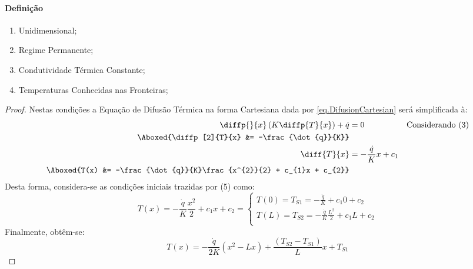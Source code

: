 \documentclass{article}
\begin{document}
            \paragraph{Definição}
                \begin{enumerate}[noitemsep]
                    \item Unidimensional;
                    \item Regime Permanente;
                    \item Condutividade Térmica Constante;
                    \item Temperaturas Conhecidas nas Fronteiras;
                \end{enumerate}
                \begin{proof}
                    Nestas condições a Equação de Difusão Térmica na forma Cartesiana dada por \ref{eq.DifusionCartesian} será simplificada à:
                        \begin{align*}
                            \diffp{}{x}\left(K\diffp{T}{x}\right) + \dot{q} &= 0 & \text{Considerando (3)}\\
                            \Aboxed{\diffp[2]{T}{x}                         &= -\frac{\dot{q}}{K}}\\
                            \diff{T}{x}  &= -\frac{\dot{q}}{K} x + c_{1}\\
                            \Aboxed{T(x) &= -\frac{\dot{q}}{K}\frac{x^{2}}{2} + c_{1}x + c_{2}}\\
                        \end{align*}
                    Desta forma, considera-se as condições iniciais trazidas por (5) como:
                        \begin{equation*}
                            T(x) = -\frac{\dot{q}}{K}\frac{x^{2}}{2} + c_{1}x + c_{2} = 
                            \begin{cases}
                                T(0) = T_{S1} = -\frac{\dot{q}}{K} + c_{1}0 + c_{2}\\
                                T(L) = T_{S2} = -\frac{\dot{q}}{K}\frac{L^{2}}{2} + c_{1}L + c_{2}\\
                            \end{cases}
                        \end{equation*}
                    Finalmente, obtêm-se:
                        \begin{equation}
                            \boxed{
                                T(x) = -\frac{\dot{q}}{2K}(x^{2} - Lx) + \frac{(T_{S2} - T_{S1})}{L}x + T_{S1}
                            }
                        \end{equation}
                \end{proof}
\end{document}
